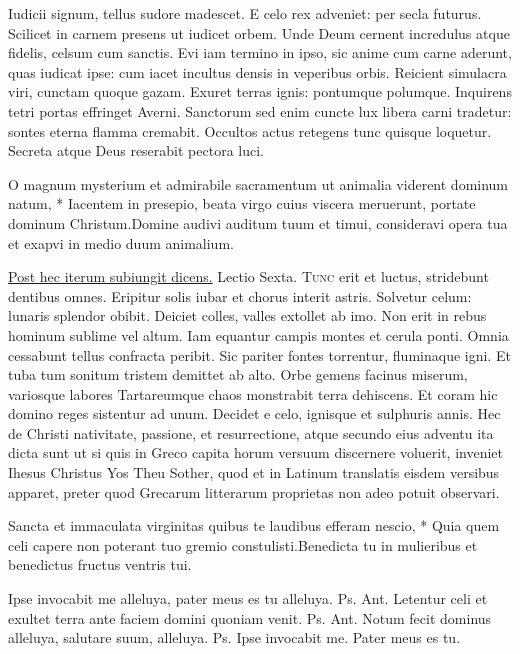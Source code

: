 \begin{multicols*}{2}
Iudicii signum, tellus sudore madescet.
E celo rex adveniet: per secla futurus.
Scilicet in carnem presens ut iudicet orbem.
Unde Deum cernent incredulus atque fidelis, celsum cum sanctis.
Evi iam termino in ipso, sic anime cum carne aderunt, quas iudicat ipse: cum iacet incultus densis in veperibus orbis.
Reicient simulacra viri, cunctam quoque gazam.
Exuret terras ignis: pontumque polumque.
Inquirens tetri portas effringet Averni.
Sanctorum sed enim cuncte lux libera carni tradetur: sontes eterna flamma cremabit.
Occultos actus retegens tunc quisque loquetur.
Secreta atque Deus reserabit pectora luci.
\begin{responsory}
{O magnum mysterium et admirabile sacramentum ut animalia viderent dominum natum, * Iacentem in presepio, beata virgo cuius viscera meruerunt, portate dominum Christum.}{Domine audivi auditum tuum et timui, consideravi opera tua et exapvi in medio duum animalium.}%
\end{responsory}
\newline \ul{Post hec iterum subiungit dicens.}
{\color{Red} Lectio Sexta.}
\lettrine[lines=2]{\zallmancaps \color{Blue} T}{unc} erit et luctus, stridebunt dentibus omnes.
Eripitur solis iubar et chorus interit astris.
Solvetur celum: lunaris splendor obibit.
Deiciet colles, valles extollet ab imo.
Non erit in rebus hominum sublime vel altum.
Iam equantur campis montes et cerula ponti.
Omnia cessabunt tellus confracta peribit.
Sic pariter fontes torrentur, fluminaque igni.
Et tuba tum sonitum tristem demittet ab alto.
Orbe gemens facinus miserum, variosque labores Tartareumque chaos monstrabit terra dehiscens.
Et coram hic domino reges sistentur ad unum.
Decidet e celo, ignisque et sulphuris annis. %
Hec de Christi nativitate, passione, et resurrectione, atque secundo eius adventu ita dicta sunt ut si quis in Greco capita horum versuum discernere voluerit, inveniet Ihesus Christus Yos Theu Sother, quod et in Latinum translatis eisdem versibus apparet, preter quod Grecarum litterarum proprietas non adeo potuit observari.
\begin{responsory-doxology}
{Sancta et immaculata virginitas quibus te laudibus efferam nescio, * Quia quem celi capere non poterant tuo gremio constulisti.}{Benedicta tu in mulieribus et benedictus fructus ventris tui.}
\end{responsory-doxology}
 Ipse invocabit me alleluya, pater meus es tu alleluya. {\color{Red} Ps.}  {\color{Red} Ant.} Letentur celi et exultet terra ante faciem domini quoniam venit. {\color{Red} Ps.}  {\color{Red} Ant.} Notum fecit dominus alleluya, salutare suum, alleluya. {\color{Red} Ps.}  \V Ipse invocabit me. \R Pater meus es tu.

\end{multicols*}

